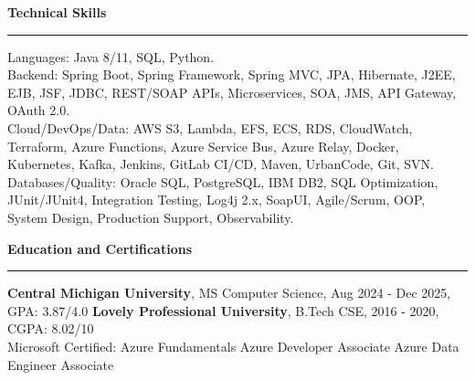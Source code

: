 \documentclass[10pt,letterpaper]{article}
\newcommand{\ressection}[1]{\vspace{2.3pt}\par\textbf{#1}\par\vspace{0.7pt}\hrule\vspace{1.3pt}}
\begin{document}
\ressection{Technical Skills}
Languages: Java 8/11, SQL, Python.\\
Backend: Spring Boot, Spring Framework, Spring MVC, JPA, Hibernate, J2EE, EJB, JSF, JDBC, REST/SOAP APIs, Microservices, SOA, JMS, API Gateway, OAuth 2.0.\\
Cloud/DevOps/Data: AWS S3, Lambda, EFS, ECS, RDS, CloudWatch, Terraform, Azure Functions, Azure Service Bus, Azure Relay, Docker, Kubernetes, Kafka, Jenkins, GitLab CI/CD, Maven, UrbanCode, Git, SVN.\\
Databases/Quality: Oracle SQL, PostgreSQL, IBM DB2, SQL Optimization, JUnit/JUnit4, Integration Testing, Log4j 2.x, SoapUI, Agile/Scrum, OOP, System Design, Production Support, Observability.

\ressection{Education and Certifications}
\textbf{Central Michigan University}, MS Computer Science, Aug 2024 - Dec 2025, GPA: 3.87/4.0 \textbar{} \textbf{Lovely Professional University}, B.Tech CSE, 2016 - 2020, CGPA: 8.02/10\\
Microsoft Certified: Azure Fundamentals \textbar{} Azure Developer Associate \textbar{} Azure Data Engineer Associate
\end{document}
